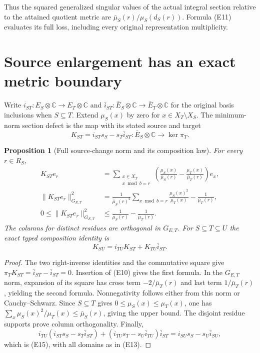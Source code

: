 \documentclass[11pt]{article}
\newtheorem{proposition}[theorem]{Proposition}
\newcommand{\C}{\mathbb C}
\begin{document}
Thus the squared generalized singular values of the actual integral
section relative to the attained quotient metric are
\(\bar\mu_S(r)/\mu_S(d_S(r))\).  Formula (E11) evaluates its full loss,
including every original representation multiplicity.

\section{Source enlargement has an exact metric boundary}

Write \(i_{ST}:E_S\otimes\C\to E_T\otimes\C\) and
\(\bar i_{ST}:\bar E_S\otimes\C\to\bar E_T\otimes\C\) for the original
basis inclusions when \(S\subseteq T\).  Extend \(\mu_S(x)\) by zero
for \(x\in X_T\setminus X_S\).  The minimum-norm section defect is the
map with its stated source and target
\[
 K_{ST}=i_{ST}s_S-s_T\bar i_{ST}:
    \bar E_S\otimes\C\longrightarrow\ker\pi_T.
 \tag{E13}
\]
\begin{proposition}[Full source-change norm and its composition law]
For every \(r\in R_S\),
\[
 \begin{split}
 K_{ST}e_r
   &=\sum_{\substack{x\in X_T\\x\bmod b=r}}
      \left(\frac{\mu_S(x)}{\bar\mu_S(r)}
           -\frac{\mu_T(x)}{\bar\mu_T(r)}\right)e_x,\\
 \|K_{ST}e_r\|_{G_{E,T}}^2
   &=\frac{1}{\bar\mu_S(r)^2}
        \sum_{x\bmod b=r}\frac{\mu_S(x)^2}{\mu_T(x)}
        -\frac1{\bar\mu_T(r)},\\
 0\leq\|K_{ST}e_r\|_{G_{E,T}}^2
   &\leq\frac1{\bar\mu_S(r)}-\frac1{\bar\mu_T(r)}.
 \end{split}
 \tag{E14}
\]
The columns for distinct residues are orthogonal in \(G_{E,T}\).  For
\(S\subseteq T\subseteq U\) the exact typed composition identity is
\[
 K_{SU}=i_{TU}K_{ST}+K_{TU}\bar i_{ST}.
 \tag{E15}
\]
\end{proposition}
\begin{proof}
The two right-inverse identities and the commutative square give
\(\pi_TK_{ST}=\bar i_{ST}-\bar i_{ST}=0\).
Insertion of (E10) gives the first formula.  In the \(G_{E,T}\) norm,
expansion of its square has cross term
\(-2/\bar\mu_T(r)\) and last term \(1/\bar\mu_T(r)\), yielding the
second formula.  Nonnegativity follows either from this norm or
Cauchy--Schwarz.  Since \(S\subseteq T\) gives
\(0\leq\mu_S(x)\leq\mu_T(x)\), one has
\(\sum_x\mu_S(x)^2/\mu_T(x)\leq\bar\mu_S(r)\), giving the upper bound.
The disjoint residue supports prove column orthogonality.  Finally,
\[
 i_{TU}(i_{ST}s_S-s_T\bar i_{ST})
 +(i_{TU}s_T-s_U\bar i_{TU})\bar i_{ST}
 =i_{SU}s_S-s_U\bar i_{SU},
 \]
which is (E15), with all domains as in (E13).
\end{proof}
\end{document}
